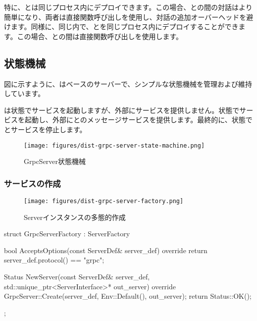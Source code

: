 \begin{content}
特に、とは同じプロセス内にデプロイできます。この場合、との間の対話はより簡単になり、両者は直接関数呼び出しを使用し、対話の追加オーバーヘッドを避けます。同様に、同じ内で、とを同じプロセス内にデプロイすることができます。この場合、との間は直接関数呼び出しを使用します。

\subsection{状態機械}

図に示すように、はベースのサーバーで、シンプルな状態機械を管理および維持しています。

は状態でサービスを起動しますが、外部にサービスを提供しません。状態でサービスを起動し、外部にとのメッセージサービスを提供します。最終的に、状態でとサービスを停止します。

\begin{figure}[H]
\centering
\texttt{[image: figures/dist-grpc-server-state-machine.png]}
\caption{GrpcServer状態機械}
 \label{fig:dist-grpc-server-state-machine}
\end{figure}

\subsubsection{サービスの作成}

\begin{figure}[H]
\centering
\texttt{[image: figures/dist-grpc-server-factory.png]}
\caption{Serverインスタンスの多態的作成}
 \label{fig:dist-grpc-server-factory}
\end{figure}

\begin{leftbar}
\begin{c++}
struct GrpcServerFactory : ServerFactory {
  bool AcceptsOptions(const ServerDef& server_def) override {
    return server_def.protocol() == "grpc";
  }

  Status NewServer(const ServerDef& server_def,
      std::unique_ptr<ServerInterface>* out_server) override {
    GrpcServer::Create(server_def, Env::Default(), out_server);
    return Status::OK();
  }
};
\end{c++}
\end{leftbar}


\end{content}
